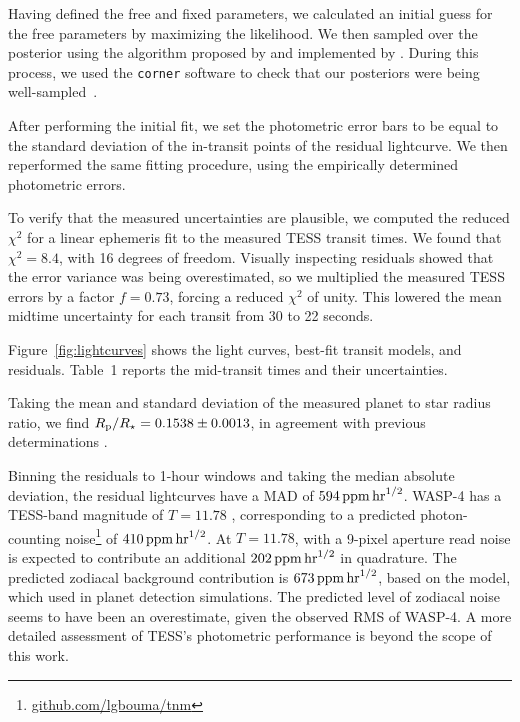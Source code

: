 \documentclass[12pt,twocolumn,tighten]{aastex62}
\begin{document}
Having defined the free and fixed parameters, we calculated an initial
guess for the free parameters by maximizing the likelihood.  We then
sampled over the posterior using the algorithm proposed by
\citet{goodman_ensemble_2010} and implemented by
\citet{foreman-mackey_emcee_2013}.  During this process, we used the
\texttt{corner} software to check that our posteriors were being
well-sampled~\citep{corner_2016}.

After performing the initial fit, we set the photometric error bars to
be equal to the standard deviation of the in-transit points of the
residual lightcurve.  We then reperformed the same fitting procedure,
using the empirically determined photometric errors.

To verify that the measured uncertainties are plausible, we computed the
reduced $\chi^2$ for a linear ephemeris fit to the measured TESS transit
times.  We found that $\chi^2 = 8.4$, with 16 degrees of freedom.
Visually inspecting residuals showed that the error variance was being
overestimated, so we multiplied the measured TESS errors by a factor
$f=0.73$, forcing a reduced $\chi^2$ of unity.  This lowered the mean
midtime uncertainty for each transit from 30 to 22
seconds.

Figure~\ref{fig:lightcurves} shows the light curves, best-fit transit
models, and residuals.  Table~1 reports the mid-transit times and
their uncertainties.

Taking the mean and standard deviation of the measured planet to star
radius ratio, we find $R_{\rm p}/R_\star=0.1538\pm0.0013$, in
agreement with previous determinations
\citep{wilson_wasp-4b_2008,gillon_improved_2009,winn_transit_2009,southworth_high-precision_2009}.

Binning the residuals to 1-hour windows and taking the median absolute
deviation, the residual lightcurves have a MAD of $594\,{\rm
ppm}\,{\rm hr}^{1/2}$.  WASP-4 has a TESS-band magnitude of $T=11.78$
\citep{stassun_TIC_2018}, corresponding to a predicted photon-counting
noise\footnote{\url{github.com/lgbouma/tnm}} of $410\,{\rm ppm}\,{\rm
hr}^{1/2}$.  At $T=11.78$, with a 9-pixel aperture read noise is
expected to contribute an additional $202\,{\rm ppm}\,{\rm hr}^{1/2}$ in
quadrature.  The predicted zodiacal background contribution is
$673\,{\rm ppm}\,{\rm hr}^{1/2}$, based on the
\citet{winn_photonflux_2013} model, which \citet{Sullivan_2015}
used in planet detection simulations.  The predicted level
of zodiacal noise seems to have been an overestimate, given the observed
RMS of WASP-4.  A more detailed assessment of TESS's photometric
performance is beyond the scope of this work.
\end{document}
